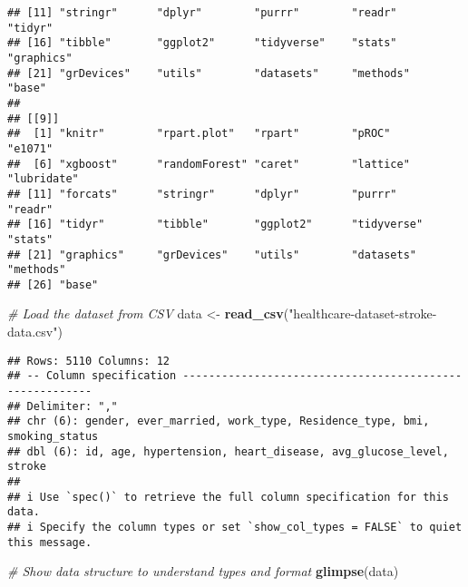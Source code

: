 \documentclass[
]{article}
\newenvironment{Shaded}{\begin{snugshade}}{\end{snugshade}}
\newcommand{\CommentTok}[1]{\textcolor[rgb]{0.56,0.35,0.01}{\textit{#1}}}
\newcommand{\FunctionTok}[1]{\textcolor[rgb]{0.13,0.29,0.53}{\textbf{#1}}}
\newcommand{\NormalTok}[1]{#1}
\newcommand{\OtherTok}[1]{\textcolor[rgb]{0.56,0.35,0.01}{#1}}
\newcommand{\StringTok}[1]{\textcolor[rgb]{0.31,0.60,0.02}{#1}}
\begin{document}
\begin{verbatim}
## [11] "stringr"      "dplyr"        "purrr"        "readr"        "tidyr"       
## [16] "tibble"       "ggplot2"      "tidyverse"    "stats"        "graphics"    
## [21] "grDevices"    "utils"        "datasets"     "methods"      "base"        
## 
## [[9]]
##  [1] "knitr"        "rpart.plot"   "rpart"        "pROC"         "e1071"       
##  [6] "xgboost"      "randomForest" "caret"        "lattice"      "lubridate"   
## [11] "forcats"      "stringr"      "dplyr"        "purrr"        "readr"       
## [16] "tidyr"        "tibble"       "ggplot2"      "tidyverse"    "stats"       
## [21] "graphics"     "grDevices"    "utils"        "datasets"     "methods"     
## [26] "base"
\end{verbatim}

\begin{Shaded}
\begin{Highlighting}[]
\CommentTok{\# Load the dataset from CSV}
\NormalTok{data }\OtherTok{\textless{}{-}} \FunctionTok{read\_csv}\NormalTok{(}\StringTok{"healthcare{-}dataset{-}stroke{-}data.csv"}\NormalTok{)}
\end{Highlighting}
\end{Shaded}

\begin{verbatim}
## Rows: 5110 Columns: 12
## -- Column specification --------------------------------------------------------
## Delimiter: ","
## chr (6): gender, ever_married, work_type, Residence_type, bmi, smoking_status
## dbl (6): id, age, hypertension, heart_disease, avg_glucose_level, stroke
## 
## i Use `spec()` to retrieve the full column specification for this data.
## i Specify the column types or set `show_col_types = FALSE` to quiet this message.
\end{verbatim}

\begin{Shaded}
\begin{Highlighting}[]
\CommentTok{\# Show data structure to understand types and format}
\FunctionTok{glimpse}\NormalTok{(data)}
\end{Highlighting}
\end{Shaded}
\end{document}
